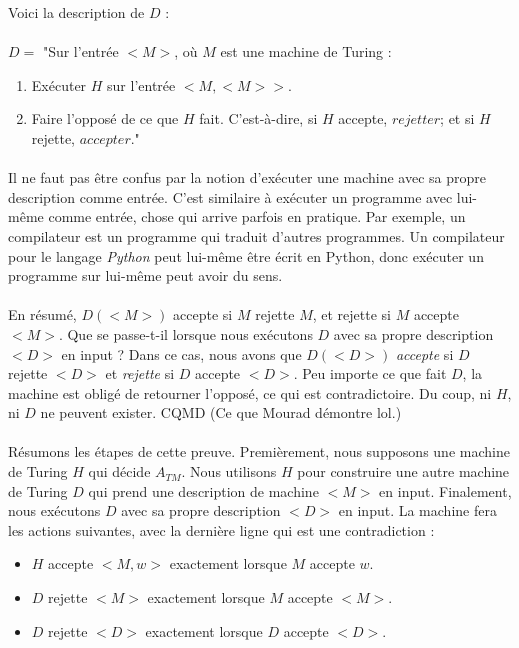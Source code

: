 Voici la description de $D$ :
\paragraph{}
$D = $ "Sur l'entrée $<M>$, où $M$ est une machine de Turing :
\begin{enumerate}
\item Exécuter $H$ sur l'entrée $<M, <M>>$.
\item Faire l'opposé de ce que $H$ fait. C'est-à-dire, si $H$ accepte, $rejetter$; et si $H$ rejette, $accepter$."
\end{enumerate}

\paragraph{}
Il ne faut pas être confus par la notion d'exécuter une machine avec sa propre description comme entrée. C'est similaire à exécuter un programme avec lui-même comme entrée, chose qui arrive parfois en pratique. Par exemple, un compilateur est un programme qui traduit d'autres programmes. Un compilateur pour le langage \textit{Python} peut lui-même être écrit en Python, donc exécuter un programme sur lui-même peut avoir du sens.

\paragraph{}
En résumé, $D(<M>)$ accepte si $M$ rejette $M$, et rejette si $M$ accepte $<M>$. Que se passe-t-il lorsque nous exécutons $D$ avec sa propre description $<D>$ en input ? Dans ce cas, nous avons que $D(<D>)$ \textit{accepte} si $D$ rejette $<D>$ et \textit{rejette} si $D$ accepte $<D>$. Peu importe ce que fait $D$, la machine est obligé de retourner l'opposé, ce qui est contradictoire. Du coup, ni $H$, ni $D$ ne peuvent exister. CQMD (Ce que Mourad démontre lol.)

\paragraph{}
Résumons les étapes de cette preuve. Premièrement, nous supposons une machine de Turing $H$ qui décide $A_{TM}$. Nous utilisons $H$ pour construire une autre machine de Turing $D$ qui prend une description de machine $<M>$ en input. Finalement, nous exécutons $D$ avec sa propre description $<D>$ en input. La machine fera les actions suivantes, avec la dernière ligne qui est une contradiction :
\begin{itemize}
\item $H$ accepte $<M, w>$ exactement lorsque $M$ accepte $w$.
\item $D$ rejette $<M>$ exactement lorsque $M$ accepte $<M>$.
\item $D$ rejette $<D>$ exactement lorsque $D$ accepte $<D>$.
\end{itemize}


